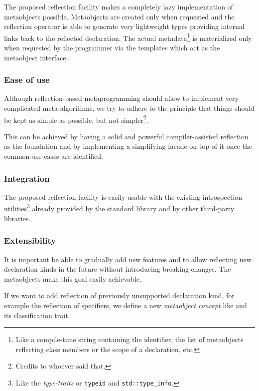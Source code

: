 The proposed reflection facility makes a completely lazy implementation of
metaobjects possible. Metaobjects are created only when requested and
the reflection operator is able to generate very
lightweight types providing internal links back to the reflected declaration.
The actual
metadata\footnote{Like a compile-time string containing the identifier,
the list of metaobjects reflecting class members or the scope of a declaration,
etc.} is materialized only when requested by the programmer via the
templates which act as the metaobject interface.

\subsubsection{Ease of use}
\label{design-ease-of-use}

Although reflection-based metaprogramming should allow to implement very
complicated meta-algorithms, we try to adhere to the principle that things
should be kept as simple as possible, but not simpler\footnote{Credits to
whoever said that.}.

This can be achieved by having a solid and powerful compiler-assisted reflection
as the foundation and by implementing a simplifying facade on top of it once
the common use-cases are identified.

\subsubsection{Integration}
\label{design-integration}

The proposed reflection facility is easily
usable with the existing introspection utilities\footnote{Like the
{\em type-traits} or \texttt{typeid} and \texttt{std::type\_info}.}
already provided by the standard library and by other third-party libraries.

\subsubsection{Extensibility}
\label{design-extensibility}

It is important be able to gradually add new features and to allow
reflecting new declaration kinds in the future without introducing breaking changes.
The metaobjects make this goal easily achievable.

If we want to add reflection of previously unsupported declaration kind, for example
the reflection of specifiers, we define a new {\em metaobject concept} like
 and its classification trait.

